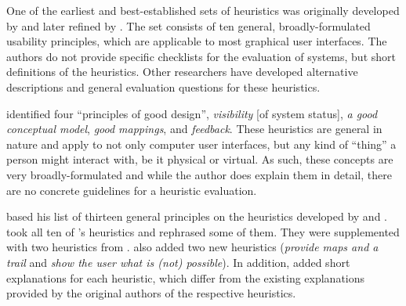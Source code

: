 One of the earliest and best-established sets of heuristics was originally developed by \citet{Molich1990} and later refined by \citet{Nielsen1994,Nielsen1994a}. The set consists of ten general, broadly-formulated usability principles, which are applicable to most graphical user interfaces. The authors do not provide specific checklists for the evaluation of systems, but short definitions of the heuristics. Other researchers \citep[e.g.][]{Perlman1997,Lavery1996} have developed alternative descriptions and general evaluation questions for these heuristics.

 identified four ``principles of good design'', \textit{visibility} [of system status], \textit{a good conceptual model}, \textit{good mappings}, and \textit{feedback}. These heuristics are general in nature and apply to not only computer user interfaces, but any kind of ``thing'' a person might interact with, be it physical or virtual. As such, these concepts are very broadly-formulated and while the author does explain them in detail, there are no concrete guidelines for a heuristic evaluation.

 based his list of thirteen general principles on the heuristics developed by \citet{Nielsen1993} and \citet{Norman2002}.  took all ten of \citeauthor{Nielsen1993}'s heuristics and rephrased some of them. They were supplemented with two heuristics from \citet{Norman2002}.  also added two new heuristics (\textit{provide maps and a trail} and \textit{show the user what is (not) possible}). In addition, \citeauthor{Perlman1997} added short explanations for each heuristic, which differ from the existing explanations provided by the original authors of the respective heuristics.

